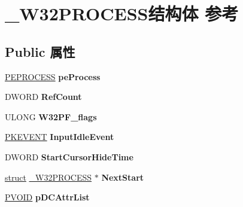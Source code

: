 \hypertarget{struct___w32_p_r_o_c_e_s_s}{}\section{\+\_\+\+W32\+P\+R\+O\+C\+E\+S\+S结构体 参考}
\label{struct___w32_p_r_o_c_e_s_s}
\subsection*{Public 属性}
\begin{DoxyCompactItemize}
\item 
\mbox{\label{struct___w32_p_r_o_c_e_s_s_a65c5f8aa34248df393448b3b6a36308c}} 
\hyperlink{struct___e_p_r_o_c_e_s_s}{P\+E\+P\+R\+O\+C\+E\+SS} {\bfseries pe\+Process}
\item 
\mbox{\label{struct___w32_p_r_o_c_e_s_s_a13012b3995eedbd91a546cde856d4fe1}} 
D\+W\+O\+RD {\bfseries Ref\+Count}
\item 
\mbox{\label{struct___w32_p_r_o_c_e_s_s_a6cc8b9199e304c2b1c68802ede9128ea}} 
U\+L\+O\+NG {\bfseries W32\+P\+F\+\_\+flags}
\item 
\mbox{\label{struct___w32_p_r_o_c_e_s_s_a4e3e1f1cb0829e5a0dec50a2135a6cfc}} 
\hyperlink{struct___k_e_v_e_n_t}{P\+K\+E\+V\+E\+NT} {\bfseries Input\+Idle\+Event}
\item 
\mbox{\label{struct___w32_p_r_o_c_e_s_s_adb2d644225218ff88942e74bd0596c1e}} 
D\+W\+O\+RD {\bfseries Start\+Cursor\+Hide\+Time}
\item 
\mbox{\label{struct___w32_p_r_o_c_e_s_s_a6138481963fcaf0deaaf7dfcc1ce6f8c}} 
\hyperlink{interfacestruct}{struct} \hyperlink{struct___w32_p_r_o_c_e_s_s}{\+\_\+\+W32\+P\+R\+O\+C\+E\+SS} $\ast$ {\bfseries Next\+Start}
\item 
\mbox{\label{struct___w32_p_r_o_c_e_s_s_a445c19c8af50c5cb353063199bb8c0b4}} 
\hyperlink{interfacevoid}{P\+V\+O\+ID} {\bfseries p\+D\+C\+Attr\+List}
\item 
\mbox{\label{struct___w32_p_r_o_c_e_s_s_ae9598a86e2f7cfea7ee7ce4197805be3}} 

\end{DoxyCompactItemize}
